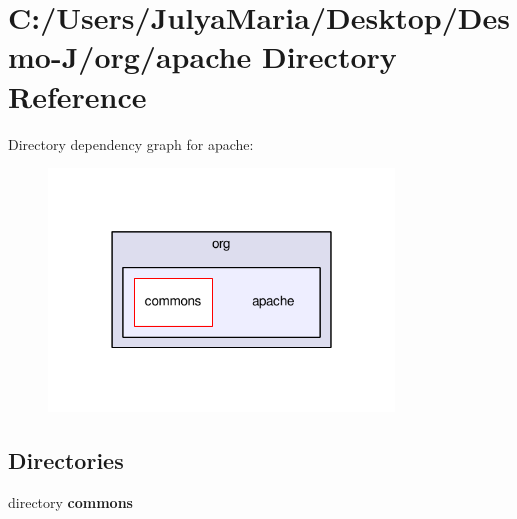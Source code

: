 \section{C\-:/\-Users/\-Julya\-Maria/\-Desktop/\-Desmo-\/\-J/org/apache Directory Reference}
\label{dir_00695b2208c8536abe008973b3e90736}
Directory dependency graph for apache\-:
\nopagebreak
\begin{figure}[H]
\begin{center}
\leavevmode
\includegraphics[width=260pt]{dir_00695b2208c8536abe008973b3e90736_dep}
\end{center}
\end{figure}
\subsection*{Directories}
\begin{DoxyCompactItemize}
\item 
directory {\bf commons}
\end{DoxyCompactItemize}
